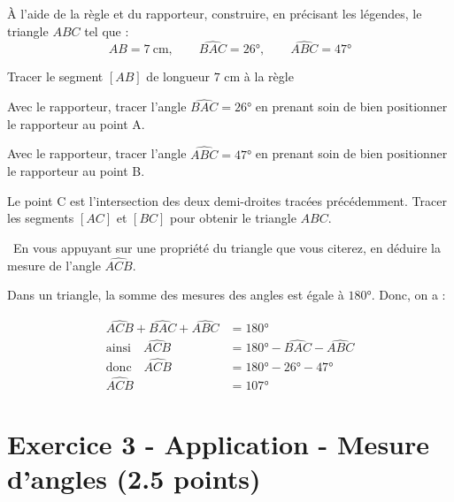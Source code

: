 \documentclass[answers]{exam}
\begin{document}
\begin{questions}
  \question[2] À l'aide de la règle et du rapporteur, construire, en précisant les légendes, le triangle $ABC$ tel que :
\[
AB = 7~\text{cm}, \qquad \widehat{BAC} = 26\text{°}, \qquad \widehat{ABC} = 47\text{°}
\]
\begin{solution}
\begin{compactitem}
  \item Tracer le segment $[AB]$ de longueur $7$ cm à la règle
  \item Avec le rapporteur, tracer l'angle $\widehat{BAC} = 26\text{°}$ en prenant soin de bien positionner le rapporteur au point A.
  \item Avec le rapporteur, tracer l'angle $\widehat{ABC} = 47\text{°}$ en prenant soin de bien positionner le rapporteur au point B.
  \item Le point C est l'intersection des deux demi-droites tracées précédemment. Tracer les segments $[AC]$ et $[BC]$ pour obtenir le triangle $ABC$.
\end{compactitem}
 

  \end{solution}
\question[0.5] \justifier\ En vous appuyant sur une propriété du triangle que vous citerez, en déduire la mesure de l'angle $\widehat{ACB}$.

\begin{solution}
Dans un triangle, la somme des mesures des angles est égale à $180\text{°}$.  
Donc, on a :

  \begin{align}
    \widehat{ACB} + \widehat{BAC} + \widehat{ABC} &= 180\text{°} \\
    \text{ainsi} \quad \widehat{ACB} &= 180\text{°} - \widehat{BAC} - \widehat{ABC} \\
    \text{donc}  \quad \widehat{ACB} &= 180\text{°} - 26\text{°} - 47\text{°} \\
    \widehat{ACB} &= 107\text{°}
  \end{align}

\end{solution}

\end{questions}


\section*{Exercice 3 - Application - Mesure d'angles (2.5 points)}
\end{document}
